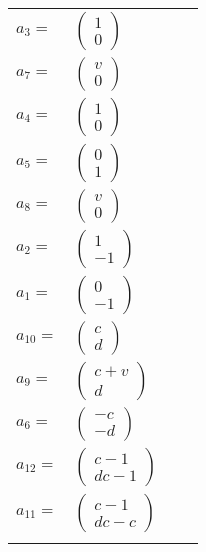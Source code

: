 \documentclass[1p]{elsarticle_modified}
\theoremstyle{definition}
\begin{document}
\begin{tabular}{m{7pt} m{180pt} m{7pt} m{180pt} }
\flushright $a_{3}=$&$\begin{pmatrix}1\\0\end{pmatrix}$ \\
\flushright $a_{7}=$&$\begin{pmatrix}v\\0\end{pmatrix}$ \\
\flushright $a_{4}=$&$\begin{pmatrix}1\\0\end{pmatrix}$ \\
\flushright $a_{5}=$&$\begin{pmatrix}0\\1\end{pmatrix}$ \\
\flushright $a_{8}=$&$\begin{pmatrix}v\\0\end{pmatrix}$ \\
\flushright $a_{2}=$&$\begin{pmatrix}1\\-1\end{pmatrix}$ \\
\flushright $a_{1}=$&$\begin{pmatrix}0\\-1\end{pmatrix}$ \\
\flushright $a_{10}=$&$\begin{pmatrix}c\\d\end{pmatrix}$ \\
\flushright $a_{9}=$&$\begin{pmatrix}c+v\\d\end{pmatrix}$ \\
\flushright $a_{6}=$&$\begin{pmatrix}- c\\- d\end{pmatrix}$ \\
\flushright $a_{12}=$&$\begin{pmatrix}c-1\\d c-1\end{pmatrix}$ \\
\flushright $a_{11}=$&$\begin{pmatrix}c-1\\d c- c\end{pmatrix}$\\&\end{tabular}
\end{document}
